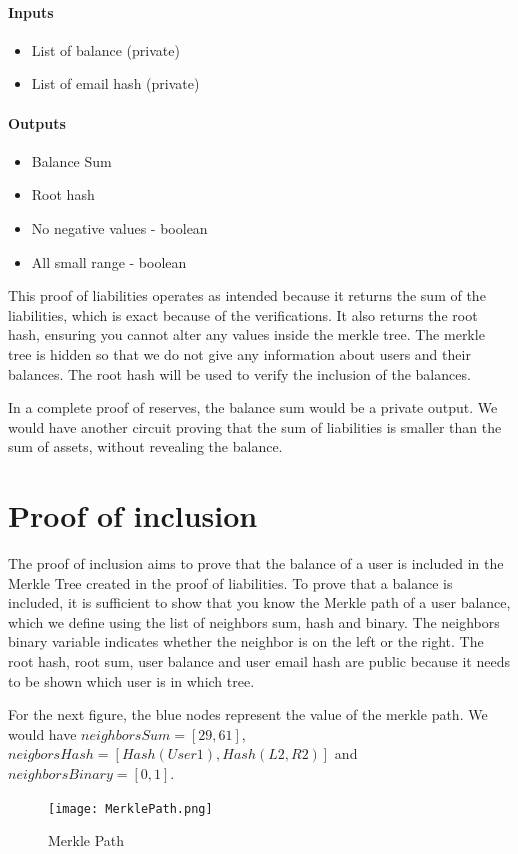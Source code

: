 \paragraph{Inputs}
\begin{itemize}
   \item List of balance (private)
   \item List of email hash (private)
   \end{itemize}

\paragraph{Outputs}
\begin{itemize}
   \item Balance Sum 
   \item Root hash
   \item No negative values - boolean
   \item All small range - boolean
   \end{itemize}

This proof of liabilities operates as intended because it returns the sum of the liabilities, which is exact because of the verifications.
It also returns the root hash, ensuring you cannot alter any values inside the merkle tree. The merkle tree is hidden so that we do not
give any information about users and their balances.
The root hash will be used to verify the inclusion of the balances.

In a complete proof of reserves, the balance sum would be a private output. We would have another circuit proving that the sum of liabilities is smaller
than the sum of assets, without revealing the balance.

\section{Proof of inclusion}
\label{subsec:pi}
The proof of inclusion aims to prove that the balance of a user is included in the Merkle Tree created in the proof of liabilities.
To prove that a balance is included, it is sufficient to show that you know the Merkle path of a user balance,
which we define using the list of neighbors sum, hash and binary.
The neighbors binary variable indicates whether the neighbor is on the left or the right.
The root hash, root sum, user balance and user email hash are public because it needs to be shown which user is in which tree.

For the next figure, the blue nodes represent the value of the merkle path.
We would have $neighborsSum=[29,61]$, $neigborsHash=[Hash(User1),Hash(L2,R2)]$ and $neighborsBinary=[0,1]$.
\begin{figure}[H]
   \centering
   \texttt{[image: MerklePath.png]}
   \caption{Merkle Path}
   \label{overflow}
   \end{figure}

